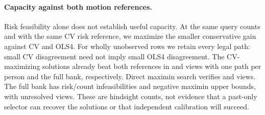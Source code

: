 \paragraph{Capacity against both motion references.}
Risk feasibility alone does not establish useful capacity.
At the same query counts and with the same CV risk reference,
we maximize the smaller conservative gain against CV and
OLS4. For wholly unobserved rows we retain every legal path:
small CV disagreement need not imply small OLS4 disagreement.
The CV-maximizing solutions already beat both references in
\FixedCVWitness{} and \FullCVWitness{} views with one path per
person and the full bank, respectively. Direct maximin search verifies
\FixedDual{} and \FullDual{} views. The full bank has
\FullRiskInfeasible{} risk/count infeasibilities and
\FullNegativeBound{} negative maximin upper bounds, with
\FullUnresolved{} unresolved views. These are hindsight
counts, not evidence that a past-only selector can recover
the solutions or that independent calibration will succeed.
